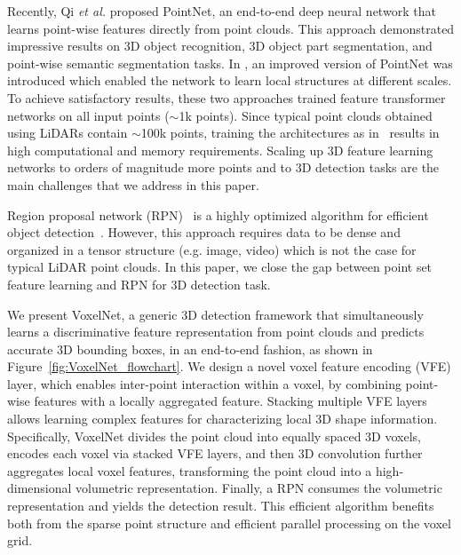 \documentclass[10pt,twocolumn,letterpaper]{article}
\begin{document}
Recently, Qi \textit{et al.}\cite{REF:qi2017pointnet} proposed PointNet, an end-to-end deep neural network that learns point-wise features directly from point clouds. This approach demonstrated impressive results on 3D object recognition, 3D object part segmentation, and point-wise semantic segmentation tasks. In \cite{REF:qi2017pointnetplusplus}, an improved version of PointNet was introduced which enabled the network to learn local structures at different scales. To achieve satisfactory results, these two approaches trained feature transformer networks on all input points ($\sim$1k points). Since typical point clouds obtained using LiDARs contain $\sim$100k points, training the architectures as in~\cite{REF:qi2017pointnet,REF:qi2017pointnetplusplus} results in high computational and memory requirements.   Scaling up 3D feature learning networks to orders of magnitude more points and to 3D detection tasks are the main challenges that we address in this paper. 




Region proposal network (RPN)~\cite{REF:NIPS2015_5638} is a highly optimized algorithm for efficient object detection~\cite{REF:ResNet2016,REF:cvpr17chen,REF:YOLO9000_2017,REF:SSD_Liu2016}. However, this approach requires data to be dense and organized in a tensor structure (e.g. image, video) which is not the case for typical LiDAR point clouds. In this paper, we close the gap between point set feature learning and RPN for 3D detection task.

We present VoxelNet, a generic 3D detection framework that simultaneously learns a discriminative feature representation from point clouds and predicts accurate 3D bounding boxes, in an end-to-end fashion, as shown in Figure~\ref{fig:VoxelNet_flowchart}.
We design a novel voxel feature encoding (VFE) layer, which enables inter-point interaction within a voxel, by combining point-wise features with a locally aggregated feature. Stacking multiple VFE layers allows learning complex features for characterizing local 3D shape information. Specifically, VoxelNet divides the point cloud into equally spaced 3D voxels, encodes each voxel via stacked VFE layers, and then 3D convolution further aggregates local voxel features, transforming the point cloud into a high-dimensional volumetric representation. Finally, a RPN consumes the volumetric representation and yields the detection result. This efficient algorithm benefits both from the sparse point structure and efficient parallel processing on the voxel grid.
\end{document}
